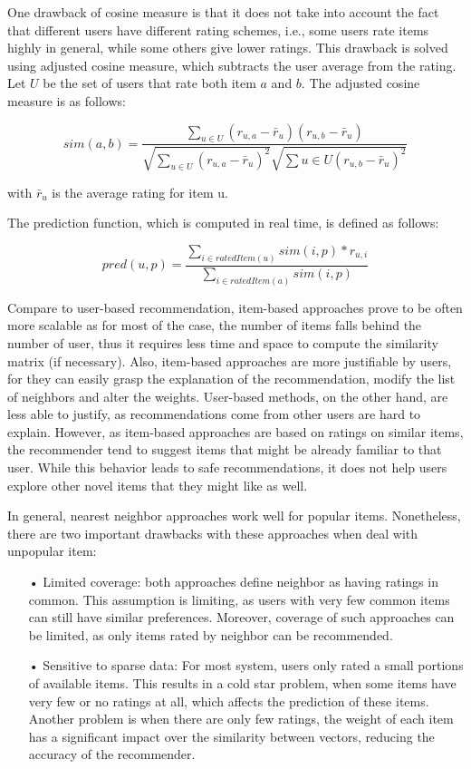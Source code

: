 One drawback of cosine measure is that it does not take into account the fact that different users have different rating schemes, i.e., some users rate items highly in general, while some others give lower ratings. This drawback is solved using adjusted cosine measure, which subtracts the user average from the rating. Let \( U\) be the set of users that rate both item \(a\) and \(b\). The adjusted cosine measure is as follows:

\begin{displaymath}
sim(a,b) = \frac{\sum_{u \in U}(r_{u,a} - \bar{r}_u)(r_{u,b} - \bar{r}_u)}{\sqrt{\sum_{u \in U}(r_{u,a} - \bar{r}_u)^2} \sqrt{\sum{u \in U}(r_{u,b} - \bar{r}_u)^2}}
\end{displaymath}

with \(\bar{r}_u \) is the average rating for item u.

The prediction function, which is computed in real time, is defined as follows:

\begin{displaymath}
pred(u,p) = \frac{\sum_{i \in ratedItem(u)}{sim(i,p) * r_{u,i}}}{\sum_{i \in ratedItem(a)}{sim(i,p)}}
\end{displaymath}

Compare to user-based recommendation, item-based approaches prove to be often more scalable as for most of the case, the number of items falls behind the number of user, thus it requires less time and space to compute the similarity matrix (if necessary). Also, item-based approaches are more justifiable by users, for they can easily grasp the explanation of the recommendation, modify the list of neighbors and alter the weights. User-based methods, on the other hand, are less able to justify, as recommendations come from other users are hard to explain. However, as item-based approaches are based on ratings on similar items, the recommender tend to suggest items that might be already familiar to that user. While this behavior leads to safe recommendations, it does not help users explore other novel items that they might like as well.

In general, nearest neighbor approaches work well for popular items. Nonetheless, there are two important drawbacks with these approaches when deal with unpopular item:

\begin{itemize}
\item[•] Limited coverage: both approaches define neighbor as having ratings in common. This assumption is limiting, as users with very few common items can still have similar preferences. Moreover, coverage of such approaches can be limited, as only items rated by neighbor can be recommended.

\item[•] Sensitive to sparse data: For most system, users only rated a small portions of available items. This results in a cold star problem, when some items have very few or no ratings at all, which affects the prediction of these items. Another problem is when there are only few ratings, the weight of each item has a significant impact over the similarity between vectors, reducing the accuracy of the recommender. 
\end{itemize}

